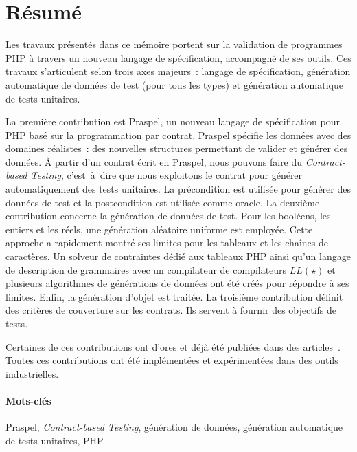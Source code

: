 \documentclass[a4paper,11pt]{article}
\newcommand{\inenglish}[1]{\foreignlanguage{english}{\em #1}}
\newcommand{\acite}[1]{\citep{#1}}
\begin{document}
\section*{Résumé}

Les travaux présentés dans ce mémoire portent sur la validation de programmes
PHP à travers un nouveau langage de spécification, accompagné de ses outils. Ces
travaux s'articulent selon trois axes majeurs~: langage de spécification,
génération automatique de données de test (pour tous les types) et génération
automatique de tests unitaires.

La première contribution est Praspel, un nouveau langage de spécification pour
PHP basé sur la programmation par contrat. Praspel spécifie les données avec des
domaines réalistes~: des nouvelles structures permettant de valider et générer
des données. À partir d'un contrat écrit en Praspel, nous pouvons faire du
\inenglish{Contract-based Testing}, c'est~à~dire que nous exploitons le contrat
pour générer automatiquement des tests unitaires. La précondition est utilisée
pour générer des données de test et la postcondition est utilisée comme oracle.
La deuxième contribution concerne la génération de données de test. Pour les
booléens, les entiers et les réels, une génération aléatoire uniforme est
employée. Cette approche a rapidement montré ses limites pour les tableaux et
les chaînes de caractères. Un solveur de contraintes dédié aux tableaux PHP
ainsi qu'un langage de description de grammaires avec un compilateur de
compilateurs $LL(\star)$ et plusieurs algorithmes de générations de données ont
été créés pour répondre à ses limites. Enfin, la génération d'objet est traitée.
La troisième contribution définit des critères de couverture sur les contrats.
Ils servent à fournir des objectifs de tests.

Certaines de ces contributions ont d'ores et déjà été publiées dans des
articles~\acite{EnderlinDGO11, EnderlinDGB12, EnderlinGB13}. Toutes ces
contributions ont été implémentées et expérimentées dans des outils
industrielles.

\paragraph{Mots-clés} Praspel, \inenglish{Contract-based Testing}, géné\-ration
de données, géné\-ration automatique de tests unitaires, PHP.



\end{document}
